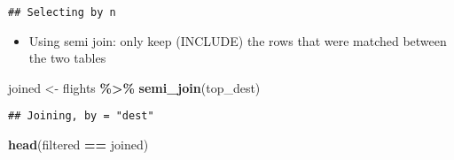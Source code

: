 \documentclass[
]{book}
\newenvironment{Shaded}{\begin{snugshade}}{\end{snugshade}}
\newcommand{\CommentTok}[1]{\textcolor[rgb]{0.56,0.35,0.01}{\textit{#1}}}
\newcommand{\KeywordTok}[1]{\textcolor[rgb]{0.13,0.29,0.53}{\textbf{#1}}}
\newcommand{\NormalTok}[1]{#1}
\newcommand{\OperatorTok}[1]{\textcolor[rgb]{0.81,0.36,0.00}{\textbf{#1}}}
\newcommand{\StringTok}[1]{\textcolor[rgb]{0.31,0.60,0.02}{#1}}
\providecommand{\tightlist}{%
  \setlength{\itemsep}{0pt}\setlength{\parskip}{0pt}}
\begin{document}
\begin{verbatim}
## Selecting by n
\end{verbatim}

\begin{Shaded}
\end{Shaded}

\begin{itemize}
\tightlist
\item
  Using semi join: only keep (INCLUDE) the rows that were matched between the two tables
\end{itemize}

\begin{Shaded}
\begin{Highlighting}[]
\NormalTok{joined \textless{}{-}}\StringTok{ }\NormalTok{flights }\OperatorTok{\%\textgreater{}\%}
\StringTok{  }\KeywordTok{semi\_join}\NormalTok{(top\_dest)}
\end{Highlighting}
\end{Shaded}

\begin{verbatim}
## Joining, by = "dest"
\end{verbatim}

\begin{Shaded}
\begin{Highlighting}[]
\KeywordTok{head}\NormalTok{(filtered }\OperatorTok{==}\StringTok{ }\NormalTok{joined)}
\end{Highlighting}
\end{Shaded}
\end{document}
